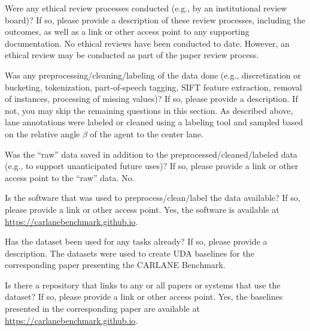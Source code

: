 \documentclass{article}
\begin{document}
	\begin{datasheetitem}{Were any ethical review processes conducted (e.g., by an institutional review board)? \normalfont If so, please provide a description of these review processes, including the outcomes, as well as a link or other access point to any supporting documentation.}
		No ethical reviews have been conducted to date. However, an ethical review may be conducted as part of the paper review process.
	\end{datasheetitem}
	\begin{datasheetitem}{Was any preprocessing/cleaning/labeling of the data done (e.g., discretization or bucketing, tokenization, part-of-speech tagging, SIFT feature extraction, removal of instances, processing of missing values)? \normalfont If so, please provide a description. If not, you may skip the remaining questions in this section.}
		As described above, lane annotations were labeled or cleaned using a labeling tool and sampled based on the relative angle $\beta$ of the agent to the center lane.
	\end{datasheetitem}
	\begin{datasheetitem}{Was the “raw” data saved in addition to the preprocessed/cleaned/labeled data (e.g., to support unanticipated future uses)? \normalfont If so, please provide a link or other access point to the “raw” data.}
		No.
	\end{datasheetitem}
	\begin{datasheetitem}{Is the software that was used to preprocess/clean/label the data available? \normalfont If so, please provide a link or other access point.}
		Yes, the software is available at \url{https://carlanebenchmark.github.io}.
	\end{datasheetitem}
	\begin{datasheetitem}{Has the dataset been used for any tasks already? \normalfont If so, please provide a description.}
		The datasets were used to create UDA baselines for the corresponding paper presenting the CARLANE Benchmark.
	\end{datasheetitem}
	\begin{datasheetitem}{Is there a repository that links to any or all papers or systems that use the dataset? \normalfont If so, please provide a link or other access point.}
		Yes, the baselines presented in the corresponding paper are available at \url{https://carlanebenchmark.github.io}.
	\end{datasheetitem}
\end{document}
